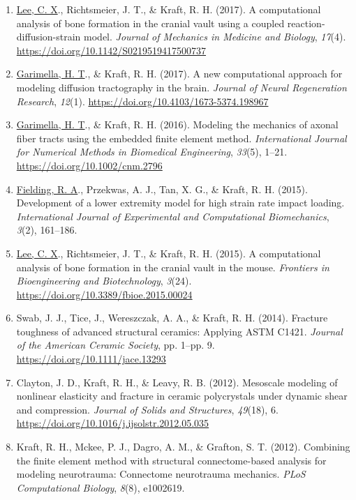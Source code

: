 \documentclass[11pt]{article}
\begin{document}
\begin{enumerate}
\item
  \underline{Lee, C. 
X}., Richtsmeier, J. 
T., \& Kraft, R. 
H. 
(2017). 
A
  computational analysis of bone formation in the cranial vault using a
  coupled reaction-diffusion-strain model. 
\emph{Journal of Mechanics in
  Medicine and Biology}, \emph{17}(4).
  \url{https://doi.org/10.1142/S0219519417500737}
\item
  \underline{Garimella, H. 
T}., \& Kraft, R. 
H. 
(2017). 
A new computational approach
  for modeling diffusion tractography in the brain. 
\emph{Journal of
  Neural Regeneration Research}, \emph{12}(1).
  \url{https://doi.org/10.4103/1673-5374.198967}
\item
  \underline{Garimella, H. 
T}., \& Kraft, R. 
H. 
(2016). 
Modeling the mechanics of
  axonal fiber tracts using the embedded finite element method.
  \emph{International Journal for Numerical Methods in Biomedical
  Engineering}, \emph{33}(5), 1--21.
  \url{https://doi.org/10.1002/cnm.2796}
\item
  \underline{Fielding, R. 
A}., Przekwas, A. 
J., Tan, X. 
G., \& Kraft, R. 
H. 
(2015).
  Development of a lower extremity model for high strain rate impact
  loading. 
\emph{International Journal of Experimental and Computational
  Biomechanics}, \emph{3}(2), 161--186.
\item
  \underline{Lee, C. 
X}., Richtsmeier, J. 
T., \& Kraft, R. 
H. 
(2015). 
A
  computational analysis of bone formation in the cranial vault in the
  mouse. 
\emph{Frontiers in Bioengineering and Biotechnology},
  \emph{3}(24). 
\url{https://doi.org/10.3389/fbioe.2015.00024}
\item
  Swab, J. 
J., Tice, J., Wereszczak, A. 
A., \& Kraft, R. 
H. 
(2014).
  Fracture toughness of advanced structural ceramics: Applying ASTM
  C1421. 
\emph{Journal of the American Ceramic Society}, pp. 
1--pp. 
9.
  \url{https://doi.org/10.1111/jace.13293}
\item
  Clayton, J. 
D., Kraft, R. 
H., \& Leavy, R. 
B. 
(2012). 
Mesoscale
  modeling of nonlinear elasticity and fracture in ceramic polycrystals
  under dynamic shear and compression. 
\emph{Journal of Solids and
  Structures}, \emph{49}(18), 6.
  \url{https://doi.org/10.1016/j.ijsolstr.2012.05.035}
\item
  Kraft, R. 
H., Mckee, P. 
J., Dagro, A. 
M., \& Grafton, S. 
T. 
(2012).
  Combining the finite element method with structural connectome-based
  analysis for modeling neurotrauma: Connectome neurotrauma mechanics.
  \emph{PLoS Computational Biology}, \emph{8}(8), e1002619.

\end{enumerate}
\end{document}
